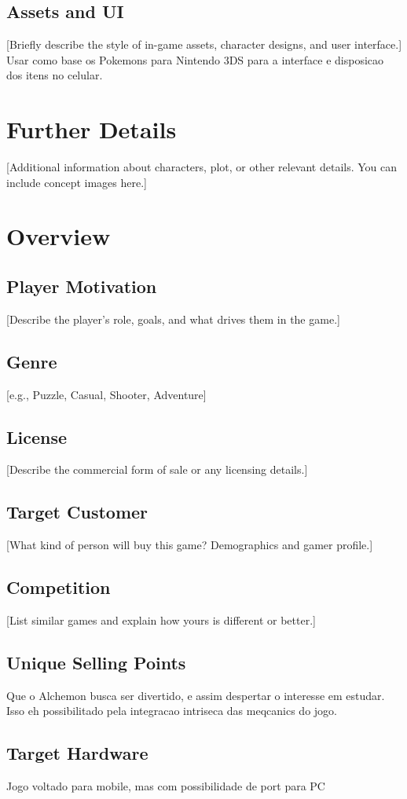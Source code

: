 \documentclass[12pt, a4paper]{article}
\begin{document}
\subsection*{Assets and UI}
[Briefly describe the style of in-game assets, character designs, and user interface.]
Usar como base os Pokemons para Nintendo 3DS para a interface e disposicao dos itens no celular. 

\section*{Further Details}
[Additional information about characters, plot, or other relevant details. You can include concept images here.]

\section*{Overview}
\subsection*{Player Motivation}
[Describe the player's role, goals, and what drives them in the game.]

\subsection*{Genre}
[e.g., Puzzle, Casual, Shooter, Adventure]

\subsection*{License}
[Describe the commercial form of sale or any licensing details.]

\subsection*{Target Customer}
[What kind of person will buy this game? Demographics and gamer profile.]

\subsection*{Competition}
[List similar games and explain how yours is different or better.]

\subsection*{Unique Selling Points}
Que o Alchemon busca ser divertido, e assim despertar o interesse em estudar. Isso eh possibilitado pela integracao intriseca das meqcanics do jogo.
\subsection*{Target Hardware}
Jogo voltado para mobile, mas com possibilidade de port para PC
\end{document}
